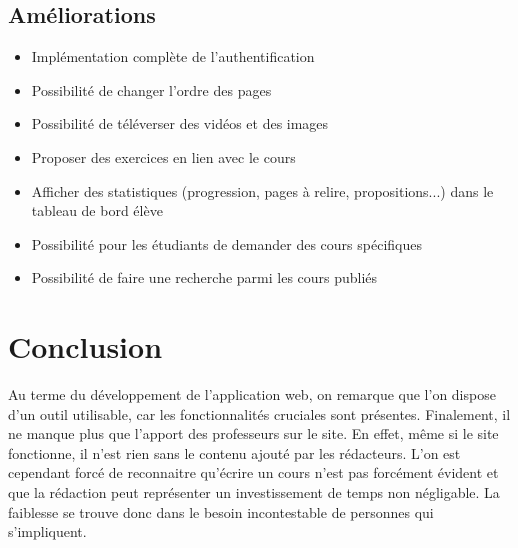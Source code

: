 \documentclass[a4paper,10pt,twoside]{sphinxmanual}
\begin{document}
\section{Améliorations}
\label{bugs:ameliorations}\begin{itemize}
\item {} 
Implémentation complète de l'authentification

\item {} 
Possibilité de changer l'ordre des pages

\item {} 
Possibilité de téléverser des vidéos et des images

\item {} 
Proposer des exercices en lien avec le cours

\item {} 
Afficher des statistiques (progression, pages à relire, propositions...) dans le tableau de bord élève

\item {} 
Possibilité pour les étudiants de demander des cours spécifiques

\item {} 
Possibilité de faire une recherche parmi les cours publiés

\end{itemize}


\chapter{Conclusion}
\label{conclusion::doc}\label{conclusion:conclusion}
Au terme du développement de l'application web, on remarque que l'on dispose d'un outil utilisable, car les fonctionnalités cruciales sont présentes. Finalement, il ne manque plus que l'apport des professeurs sur le site. En effet, même si le site fonctionne, il n'est rien sans le contenu ajouté par les rédacteurs. L'on est cependant forcé de reconnaitre qu'écrire un cours n'est pas forcément évident et que la rédaction peut représenter un investissement de temps non négligable. La faiblesse se trouve donc dans le besoin incontestable de personnes qui s'impliquent.
\end{document}
